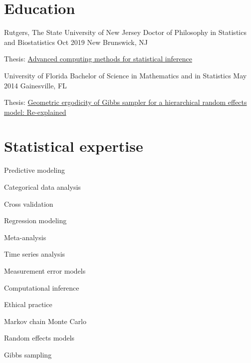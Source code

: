 \documentclass[letterpaper]{resume_config}
\begin{document}

\section{Education}

\EducationExperience
    {Rutgers, The State University of New Jersey} %
    {Doctor of Philosophy in Statistics and Biostatistics} %
    {Oct 2019} %
    {New Brunswick, NJ} %
    {\item Thesis: \href{    https://rucore.libraries.rutgers.edu/rutgers-lib/61966/}{Advanced computing methods for statistical inference} 
    }

\EducationExperience
    {University of Florida} %
    {Bachelor of Science in Mathematics and in Statistics} %
    {May 2014} %
    {Gainesville, FL} %
    {\item Thesis: \href{https://ufdc.ufl.edu/AA00057032/00001}{Geometric ergodicity of Gibbs sampler for a hierarchical random effects model: Re-explained}}


\section{Statistical expertise}
\begin{SkillsList}
	\item Predictive modeling 
	\item Categorical data analysis 
	\item Cross validation 
	\item Regression modeling 
	\item Meta-analysis 
	\item Time series analysis 
	\item Measurement error models
	\item Computational inference 
	\item Ethical practice  
	\item Markov chain Monte Carlo 
	\item Random effects models 
	\item Gibbs sampling 
\end{SkillsList}
\end{document}
